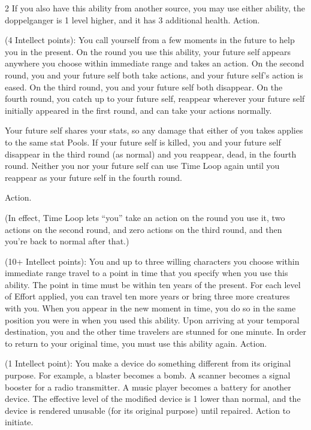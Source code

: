 \begin{multicols}{2}
If you also have this ability from another source, you may use either ability, the doppelganger is 1 level higher, and it has 3 additional health. Action. 
 
 (4 Intellect points): You call yourself from a few moments in the future to help you in the present. On the round you use this ability, your future self appears anywhere you choose within immediate range and takes an action. On the second round, you and your future self both take actions, and your future self’s action is eased. On the third round, you and your future self both disappear. On the fourth round, you catch up to your future self, reappear wherever your future self initially appeared in the first round, and can take your actions normally. 

Your future self shares your stats, so any damage that either of you takes applies to the same stat Pools. If your future self is killed, you and your future self disappear in the third round (as normal) and you reappear, dead, in the fourth round. Neither you nor your future self can use Time Loop again until you reappear as your future self in the fourth round. 

Action.

(In effect, Time Loop lets “you” take an action on the round you use it, two actions on the second round, and zero actions on the third round, and then you’re back to normal after that.)
 
 (10+ Intellect points): You and up to three willing characters you choose within immediate range travel to a point in time that you specify when you use this ability. The point in time must be within ten years of the present. For each level of Effort applied, you can travel ten more years or bring three more creatures with you. When you appear in the new moment in time, you do so in the same position you were in when you used this ability. Upon arriving at your temporal destination, you and the other time travelers are stunned for one minute. In order to return to your original time, you must use this ability again. Action. 
 
 (1 Intellect point): You make a device do something different from its original purpose. For example, a blaster becomes a bomb. A scanner becomes a signal booster for a radio transmitter. A music player becomes a battery for another device. The effective level of the modified device is 1 lower than normal, and the device is rendered unusable (for its original purpose) until repaired. Action to initiate. 
 

\end{multicols}
